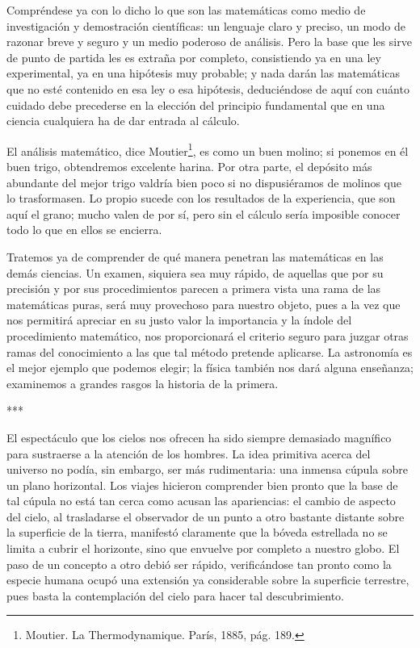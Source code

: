 \documentclass[a4paper, 12pt]{article}
\begin{document}
Compréndese ya con lo dicho lo que son las matemáticas como medio de investigación y demostración científicas: un lenguaje claro y preciso, un modo de razonar breve y seguro y un medio poderoso de análisis. Pero la base que les sirve de punto de partida les es extraña por completo, consistiendo ya en una ley experimental, ya en una hipótesis muy probable; y nada darán las matemáticas que no esté contenido en esa ley o esa hipótesis, deduciéndose de aquí con cuánto cuidado debe precederse en la elección del principio fundamental que en una ciencia cualquiera ha de dar entrada al cálculo.

El análisis matemático, dice Moutier\footnote{Moutier. La Thermodynamique. París, 1885, pág. 189.}, es como un buen molino; si ponemos en él buen trigo, obtendremos excelente harina. Por otra parte, el depósito más abundante del mejor trigo valdría bien poco si no dispusiéramos de molinos que lo trasformasen. Lo propio sucede con los resultados de la experiencia, que son aquí el grano; mucho valen de por sí, pero sin el cálculo sería imposible conocer todo lo que en ellos se encierra.

Tratemos ya de comprender de qué manera penetran las matemáticas en las demás ciencias. Un examen, siquiera sea muy rápido, de aquellas que por su precisión y por sus procedimientos parecen a primera vista una rama de las matemáticas puras, será muy provechoso para nuestro objeto, pues a la vez que nos permitirá apreciar en su justo valor la importancia y la índole del procedimiento matemático, nos proporcionará el criterio seguro para juzgar otras ramas del conocimiento a las que tal método pretende aplicarse. La astronomía es el mejor ejemplo que podemos elegir; la física también nos dará alguna enseñanza; examinemos a grandes rasgos la historia de la primera.

\bigskip

\centerline{***}

El espectáculo que los cielos nos ofrecen ha sido siempre demasiado magní\-fico para sustraerse a la atención de los hombres. La idea primitiva acerca del universo no podía, sin embargo, ser más rudimentaria: una inmensa cúpula sobre un plano horizontal. Los viajes hicieron comprender bien pronto que la base de tal cúpula no está tan cerca como acusan las apariencias: el cambio de aspecto del cielo, al trasladarse el observador de un punto a otro bastante distante sobre la superficie de la tierra, manifestó claramente que la bóveda estrellada no se limita a cubrir el horizonte, sino que envuelve por completo a nuestro globo. El paso de un concepto a otro debió ser rápido, verificándose tan pronto como la especie humana ocupó una extensión ya considerable sobre la superficie terrestre, pues basta la contemplación del cielo para hacer tal descubrimiento.
\end{document}

